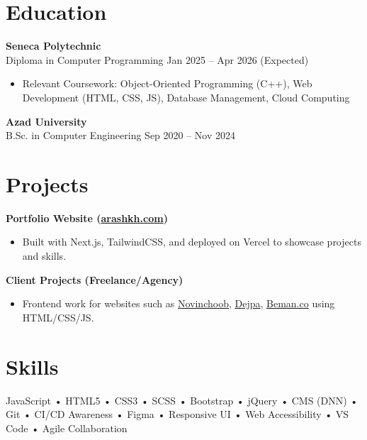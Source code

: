 \documentclass[letterpaper,11pt]{article}
\begin{document}
\vspace{0.6em}

\section*{Education}
\textbf{Seneca Polytechnic}\\
Diploma in Computer Programming \hfill Jan 2025 -- Apr 2026 (Expected)
\begin{itemize}[leftmargin=*]
  \item Relevant Coursework: Object-Oriented Programming (C++), Web Development (HTML, CSS, JS), Database Management, Cloud Computing
\end{itemize}

\textbf{Azad University}\\
B.Sc. in Computer Engineering \hfill Sep 2020 -- Nov 2024

\vspace{0.6em}

\section*{Projects}
\textbf{Portfolio Website (\href{https://arashkh.com}{arashkh.com})}\\
\begin{itemize}[leftmargin=*]
  \item Built with Next.js, TailwindCSS, and deployed on Vercel to showcase projects and skills.
\end{itemize}

\textbf{Client Projects (Freelance/Agency)}\\
\begin{itemize}[leftmargin=*]
  \item Frontend work for websites such as \href{https://novinchoob.com/en-us/}{Novinchoob}, \href{https://dejpa.com}{Dejpa}, \href{https://beman.co}{Beman.co} using HTML/CSS/JS.
\end{itemize}

\vspace{0.6em}

\section*{Skills}
JavaScript • HTML5 • CSS3 • SCSS • Bootstrap • jQuery • CMS (DNN) • Git • CI/CD Awareness • Figma • Responsive UI • Web Accessibility • VS Code • Agile Collaboration
\end{document}
